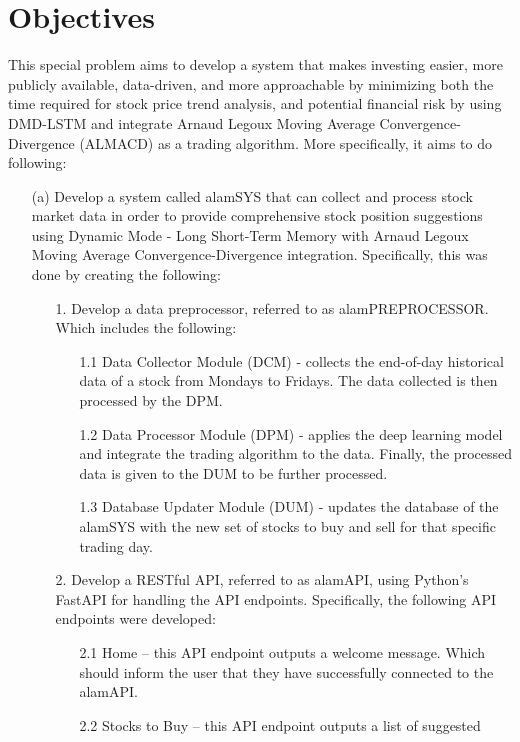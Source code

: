 \section{Objectives}
\label{sec:objectives}
This special problem aims to develop a system that makes investing easier, 
more publicly available, data-driven, and more approachable by minimizing both the 
time required for stock price trend analysis, and potential financial risk 
by using DMD-LSTM and integrate Arnaud Legoux Moving Average Convergence-Divergence (ALMACD)
as a trading algorithm. More specifically, it aims to do following:
\begin{itemize}
  \item[(a)] Develop a system called alamSYS that can collect and process stock market data in order 
  to provide comprehensive stock position suggestions using Dynamic Mode - Long Short-Term Memory with 
  Arnaud Legoux Moving Average Convergence-Divergence integration. Specifically, this was done
  by creating the following:
    \begin{itemize}
      \item[1.] Develop a data preprocessor, referred to as alamPREPROCESSOR. 
      Which includes the following:
        \begin{itemize}
          \item[1.1] Data Collector Module (DCM) - collects the end-of-day historical data of a 
          stock from Mondays to Fridays. The data collected is then processed by the DPM.
          \item[1.2] Data Processor Module (DPM) - applies the deep learning model and 
          integrate the trading algorithm to the data. Finally, the processed data is given 
          to the DUM to be further processed.
          \item[1.3] Database Updater Module (DUM) - updates the database of the alamSYS
          with the new set of stocks to buy and sell for that specific trading day.
        \end{itemize}
      \item[2.] Develop a RESTful API, referred to as alamAPI, 
      using Python's FastAPI for handling the API endpoints.
      Specifically, the following API endpoints were developed:
        \begin{itemize}
            \item[2.1] Home – this API endpoint outputs a welcome message. 
            Which should inform the user that they have successfully connected to the alamAPI.
            \item[2.2]	Stocks to Buy – this API endpoint outputs a list of suggested 

\end{itemize}
\end{itemize}
\end{itemize}
